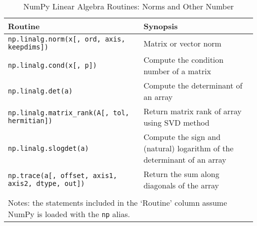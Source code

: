 \documentclass[a4paper,11pt]{book}
\numberwithin{figure}{chapter}
\numberwithin{table}{chapter}
\begin{document}
\begin{sidewaystable}[!htbp]
	\centering
	\caption{NumPy Linear Algebra Routines: Norms and Other Number}
	\label{tab:norms}
	\begin{tabular}{ll}
		\toprule \toprule
			Routine & Synopsis \\
			\midrule
                        \texttt{np.linalg.norm(x[, ord, axis, keepdims])} &
                        Matrix or vector norm\\
                        \texttt{np.linalg.cond(x[, p])}&
                        Compute the condition number of a matrix\\
                        \texttt{np.linalg.det(a)}&
                        Compute the determinant of an array\\
                        \texttt{np.linalg.matrix\_rank(A[, tol, hermitian])}&
                        Return matrix rank of array using SVD method\\
                        \texttt{np.linalg.slogdet(a)}&
                        Compute the sign and (natural) logarithm of the determinant of an array\\
                        \texttt{np.trace(a[, offset, axis1, axis2, dtype, out])}&
                        Return the sum along diagonals of the array\\            
	     	\bottomrule \\[-1.8ex]
	        \multicolumn{2}{l}{Notes: the statements included in the `Routine' column assume NumPy is loaded with the \texttt{np} alias.} \\
	\end{tabular}
\end{sidewaystable} 
\end{document}
